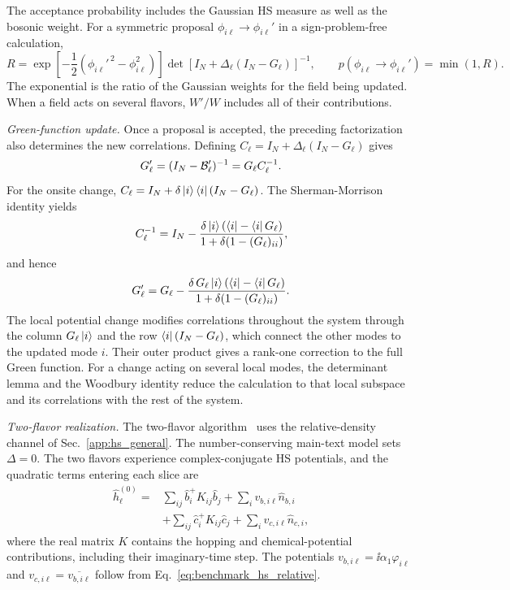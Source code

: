 The acceptance probability includes the Gaussian HS measure as well as the bosonic weight. For a symmetric proposal $\phi_{i\ell}\to\phi_{i\ell}'$ in a sign-problem-free calculation,
\begin{equation}
    R=\exp\left[-\frac12(\phi_{i\ell}'^{\,2}-\phi_{i\ell}^{2})\right]
    \det\!\left[I_N+\Delta_\ell(I_N-G_\ell)\right]^{-1},
    \qquad
    p(\phi_{i\ell}\to\phi_{i\ell}')=\min(1,R).
\end{equation}
The exponential is the ratio of the Gaussian weights for the field being updated. When a field acts on several flavors, $W'/W$ includes all of their contributions.

\emph{Green-function update.} Once a proposal is accepted, the preceding factorization also determines the new correlations. Defining $C_\ell=I_N+\Delta_\ell(I_N-G_\ell)$ gives
\begin{equation}
    G_\ell'=(I_N-\mathcal{B}_\ell')^{-1}=G_\ell C_\ell^{-1}.
    \label{eq:number_green_update_general}
\end{equation}
For the onsite change, $C_\ell=I_N+\delta\ket{i}\bra{i}(I_N-G_\ell)$. The Sherman-Morrison identity yields
\begin{equation}
    C_\ell^{-1}
    =I_N-\frac{\delta\ket{i}(\bra{i}-\bra{i}G_\ell)}
                    {1+\delta(1-(G_\ell)_{ii})},
    \label{eq:number_sherman_morrison}
\end{equation}
and hence
\begin{equation}
    G_\ell'
    =G_\ell-\frac{\delta\,G_\ell\ket{i}(\bra{i}-\bra{i}G_\ell)}
                       {1+\delta(1-(G_\ell)_{ii})}.
\end{equation}
The local potential change modifies correlations throughout the system through the column $G_\ell\ket{i}$ and the row $\bra{i}(I_N-G_\ell)$, which connect the other modes to the updated mode $i$. Their outer product gives a rank-one correction to the full Green function. For a change acting on several local modes, the determinant lemma and the Woodbury identity reduce the calculation to that local subspace and its correlations with the rest of the system.

\emph{Two-flavor realization.} The two-flavor algorithm~\cite{bafqmc_code} uses the relative-density channel of Sec.~\ref{app:hs_general}. The number-conserving main-text model sets $\Delta=0$. The two flavors experience complex-conjugate HS potentials, and the quadratic terms entering each slice are
\begin{equation}
\begin{aligned}
    \hat h_\ell^{(0)}
    ={}&\sum_{ij}\hat b_i^+K_{ij}\hat b_j
       +\sum_i v_{b,i\ell}\hat n_{b,i}\\
       &+\sum_{ij}\hat c_i^+K_{ij}\hat c_j
       +\sum_i v_{c,i\ell}\hat n_{c,i},
\end{aligned}
    \label{eq:number_benchmark_slice}
\end{equation}
where the real matrix $K$ contains the hopping and chemical-potential contributions, including their imaginary-time step. The potentials $v_{b,i\ell}=\ii\alpha_1\varphi_{i\ell}$ and $v_{c,i\ell}=\overline{v_{b,i\ell}}$ follow from Eq.~\eqref{eq:benchmark_hs_relative}.

